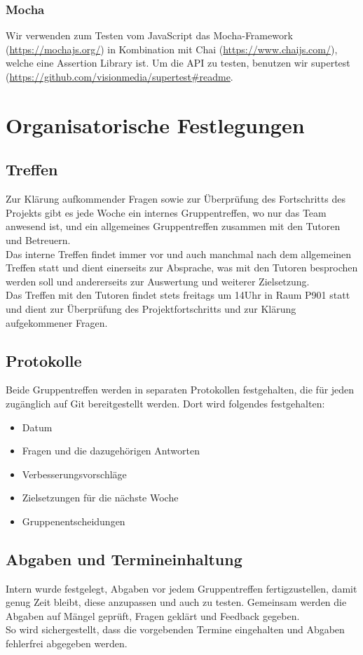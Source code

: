\documentclass[11pt,a4paper]{report}
\begin{document}
\subsubsection{Mocha}
Wir verwenden zum Testen vom JavaScript das Mocha-Framework (\url{https://mochajs.org/}) in Kombination mit Chai (\url{https://www.chaijs.com/}), welche eine Assertion Library ist. Um die API zu testen, benutzen wir supertest (\url{https://github.com/visionmedia/supertest#readme}. 
\clearpage
\section{Organisatorische Festlegungen}
\subsection{Treffen}
Zur Klärung aufkommender Fragen sowie zur Überprüfung des Fortschritts des Projekts gibt es jede Woche ein internes Gruppentreffen, wo nur das Team anwesend ist, und ein allgemeines Gruppentreffen zusammen mit den Tutoren und Betreuern.\\
Das interne Treffen findet immer vor und auch manchmal nach dem allgemeinen Treffen statt und dient einerseits zur Absprache, was mit den Tutoren besprochen werden soll und andererseits zur Auswertung und weiterer Zielsetzung.\\
Das Treffen mit den Tutoren findet stets freitags um 14Uhr in Raum P901 statt und dient zur Überprüfung des Projektfortschritts und zur Klärung aufgekommener Fragen.
\subsection{Protokolle}
Beide Gruppentreffen werden in separaten Protokollen festgehalten, die für jeden zugänglich auf Git bereitgestellt werden. Dort wird folgendes festgehalten:
\begin{itemize}
\item Datum
\item Fragen und die dazugehörigen Antworten
\item Verbesserungsvorschläge 
\item Zielsetzungen für die nächste Woche
\item Gruppenentscheidungen
\end{itemize}
\subsection{Abgaben und Termineinhaltung}
Intern wurde festgelegt, Abgaben vor jedem Gruppentreffen fertigzustellen, damit genug Zeit bleibt, diese anzupassen und auch zu testen. Gemeinsam werden die Abgaben auf Mängel geprüft, Fragen geklärt und Feedback gegeben.\\
So wird sichergestellt, dass die vorgebenden Termine eingehalten und Abgaben fehlerfrei abgegeben werden.
\end{document}
